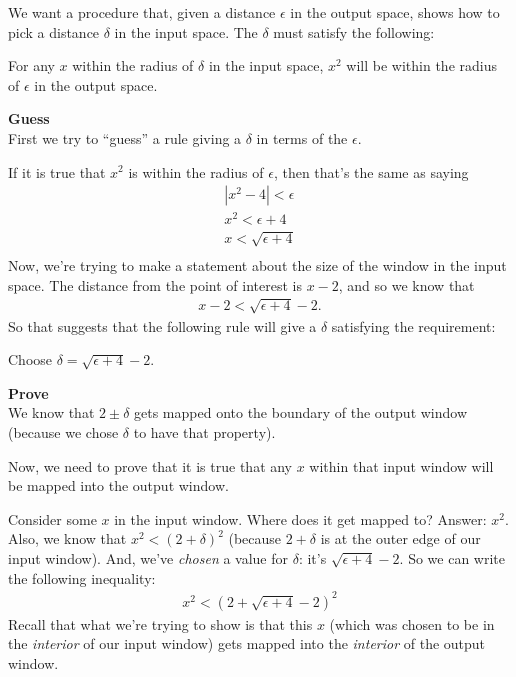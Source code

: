 \documentclass[12pt]{article}
\begin{document}
\begin{mdframed}
  We want a procedure that, given a distance $\epsilon$ in the output space,
  shows how to pick a distance $\delta$ in the input space. The $\delta$ must satisfy the following:

  For any $x$ within the radius of $\delta$ in the input space, $x^2$ will be
  within the radius of $\epsilon$ in the output space.

  \textbf{Guess}\\
  First we try to ``guess'' a rule giving a $\delta$ in terms of the $\epsilon$.

  If it is true that $x^2$ is within the radius of $\epsilon$, then that's the
  same as saying
  \begin{align*}
    |x^2 - 4| < \epsilon\\
    x^2 < \epsilon + 4\\
    x < \sqrt{\epsilon + 4}\\
  \end{align*}
  Now, we're trying to make a statement about the size of the window in the
  input space. The distance from the point of interest is $x - 2$, and so we
  know that
  \begin{align*}
    x - 2 < \sqrt{\epsilon + 4} - 2.
  \end{align*}
  So that suggests that the following rule will give a $\delta$ satisfying the
  requirement:

  Choose $\delta = \sqrt{\epsilon + 4} - 2$.

  \textbf{Prove}\\
  We know that $2 \pm \delta$ gets mapped onto the boundary of the output
  window (because we chose $\delta$ to have that property).

  Now, we need to prove that it is true that any $x$ within that input window
  will be mapped into the output window.

  Consider some $x$ in the input window. Where does it get mapped to? Answer:
  $x^2$. Also, we know that $x^2 < (2 + \delta)^2$ (because $2+\delta$ is at
  the outer edge of our input window). And, we've \textit{chosen} a value for
  $\delta$: it's $\sqrt{\epsilon + 4} - 2$. So we can write the following
  inequality:
  \begin{align*}
    x^2 < (2 + \sqrt{\epsilon + 4} - 2)^2
  \end{align*}
  Recall that what we're trying to show is that this $x$ (which was chosen to
  be in the \textit{interior} of our input window) gets mapped into the
  \textit{interior} of the output window.


\end{mdframed}
\end{document}
